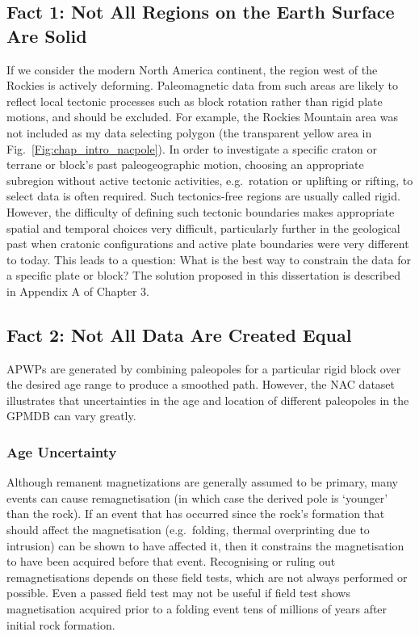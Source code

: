 \subsection{Fact 1: Not All Regions on the Earth Surface Are
Solid}\label{sec:f1}

If we consider the modern North America continent, the region west of the
Rockies is actively deforming. Paleomagnetic data from such areas are likely to
reflect local tectonic processes such as block rotation rather than rigid plate
motions, and should be excluded. For example, the Rockies Mountain area was not
included as my data selecting polygon (the transparent yellow area in
Fig.~\ref{Fig:chap_intro_nacpole}). In order to investigate a specific craton or
terrane or block's past paleogeographic motion, choosing an appropriate
subregion without active tectonic activities, e.g.\ rotation or uplifting or
rifting, to select data is often required. Such tectonics-free regions are
usually called rigid. However, the difficulty of defining such tectonic
boundaries makes appropriate spatial and temporal choices very difficult,
particularly further in the geological past when cratonic configurations and
active plate boundaries were very different to today. This leads to a question:
What is the best way to constrain the data for a specific plate or block? The
solution proposed in this dissertation is described in Appendix A of Chapter 3.

\subsection{Fact 2: Not All Data Are Created Equal}\label{sec:f2}

APWPs are generated by combining paleopoles for a particular rigid block over
the desired age range to produce a smoothed path. However, the NAC dataset
illustrates that uncertainties in the age and location of different paleopoles
in the GPMDB can vary greatly.

\subsubsection{Age Uncertainty}\label{sec:ageu}

Although remanent magnetizations are generally assumed to be primary, many
events can cause remagnetisation (in which case the derived pole is `younger'
than the rock). If an event that has occurred since the rock's formation that
should affect the magnetisation (e.g.\ folding, thermal overprinting due to
intrusion) can be shown to have affected it, then it constrains the
magnetisation to have been acquired before that event. Recognising or ruling
out remagnetisations depends on these field tests, which are not always
performed or possible. Even a passed field test may not be useful if field test
shows magnetisation acquired prior to a folding event tens of millions of years
after initial rock formation.

